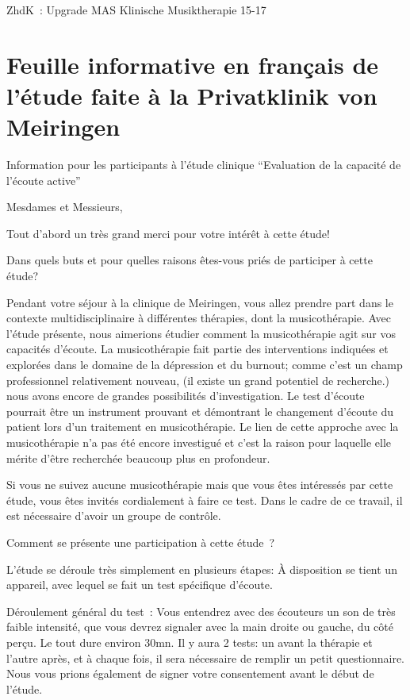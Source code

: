 \textgerman{ZhdK : Upgrade MAS Klinische Musiktherapie 15-17}

\section{Feuille informative en français de l'étude faite à la Privatklinik von Meiringen}

Information pour les participants à l'étude clinique
\foreignquote{french}{Evaluation de la capacité de l'écoute active}


Mesdames et Messieurs,

Tout d'abord un très grand merci pour votre intérêt à cette étude!

Dans quels buts et pour quelles raisons êtes-vous priés de participer à
cette étude?

Pendant votre séjour à la clinique de Meiringen, vous allez prendre
part dans le contexte multidisciplinaire à différentes thérapies, dont
la musicothérapie. Avec l'étude présente, nous aimerions étudier comment
la musicothérapie agit sur vos capacités d'écoute.
La musicothérapie fait partie des interventions indiquées et explorées dans le domaine
de la dépression et du burnout; comme c'est un champ
professionnel
relativement nouveau, (il existe un grand potentiel de recherche.) nous avons encore de grandes possibilités d'investigation.
Le test d'écoute pourrait être un instrument prouvant et démontrant le changement
d'écoute du patient lors d'un traitement en musicothérapie.
Le lien de cette approche avec la musicothérapie n'a pas été encore
investigué et c'est la raison pour laquelle elle mérite d'être
recherchée beaucoup plus en profondeur.

Si vous ne suivez aucune musicothérapie mais que vous êtes intéressés
par cette étude, vous êtes invités cordialement à faire ce test. Dans
le cadre de ce travail, il est nécessaire d'avoir un groupe de contrôle.

Comment se présente une participation à cette étude ?

L'étude se déroule très simplement en plusieurs étapes:
À disposition se tient un appareil, avec lequel se fait un test spécifique d'écoute.

Déroulement général du test :
Vous entendrez  avec des écouteurs un son de très faible intensité, que
vous devrez signaler avec la main droite ou gauche, du côté
perçu.
Le tout dure environ 30mn.
Il y aura 2 tests: un avant la thérapie et l'autre après, et à chaque
fois, il sera nécessaire de remplir un petit questionnaire.
Nous vous prions également de signer votre consentement avant le début
de l'étude.


